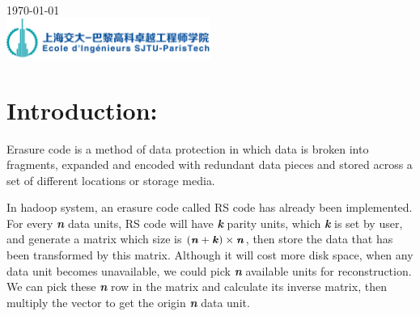 \documentclass[10pt]{article}
\begin{document}
\begin{titlepage}


{\large \today}\\[2cm] %


\includegraphics[width=0.5\textwidth]{logo_SPEIT.jpg}\\[1cm] %


\vfill %

\end{titlepage}
\indent
\section{Introduction:}
Erasure code is a method of data protection in which data is broken into fragments, expanded and encoded with redundant data pieces and stored across a set of different locations or storage media.

In hadoop system, an erasure code called RS code has already been implemented. For every \textbf{\textit{n}} data units, RS code will have \textbf{\textit{k}} parity units, which \textbf{\textit{k}} is set by user, and generate a matrix which size is $(\textbf{\textit{n}}+\textbf{\textit{k}})\times \textbf{\textit{n}}$, then store the data that has been transformed by this matrix. Although it will cost more disk space, when any data unit becomes unavailable, we could pick \textbf{\textit{n}} available units for reconstruction. We can pick these \textbf{\textit{n}} row in the matrix and calculate its inverse matrix, then multiply the vector to get the origin \textbf{\textit{n}} data unit.
\end{document}

